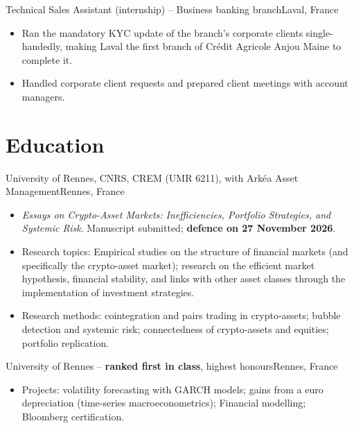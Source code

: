 \documentclass[10pt]{article}
\begin{document}
\entrygap
{}
      {Technical Sales Assistant (internship) -- Business banking branch}{Laval, France}
\begin{itemize}
  \item Ran the mandatory KYC update of the branch's corporate clients single-handedly, making
        Laval the first branch of Crédit Agricole Anjou Maine to complete it.
  \item Handled corporate client requests and prepared client meetings with account managers.
\end{itemize}

\section{Education}

      {University of Rennes, CNRS, CREM (UMR 6211), with Arkéa Asset Management}{Rennes, France}
\begin{itemize}
  \item \textit{Essays on Crypto-Asset Markets: Inefficiencies, Portfolio Strategies, and Systemic
        Risk}. Manuscript submitted; \textbf{defence on 27 November 2026}.
 \item Research topics: Empirical studies on the structure of financial markets (and specifically
       the crypto-asset market); research on the efficient market hypothesis, financial stability,
       and links with other asset classes through the implementation of investment strategies.
 \item Research methods: cointegration and pairs trading in crypto-assets; bubble detection and
        systemic risk; connectedness of crypto-assets and equities; portfolio replication.
\end{itemize}

\entrygap
{}
      {University of Rennes -- \textbf{ranked first in class}, highest honours}{Rennes, France}
\begin{itemize}
  \item Projects: volatility forecasting with GARCH models; gains from a euro depreciation
        (time-series macroeconometrics); Financial modelling; Bloomberg certification.
\end{itemize}
\end{document}
